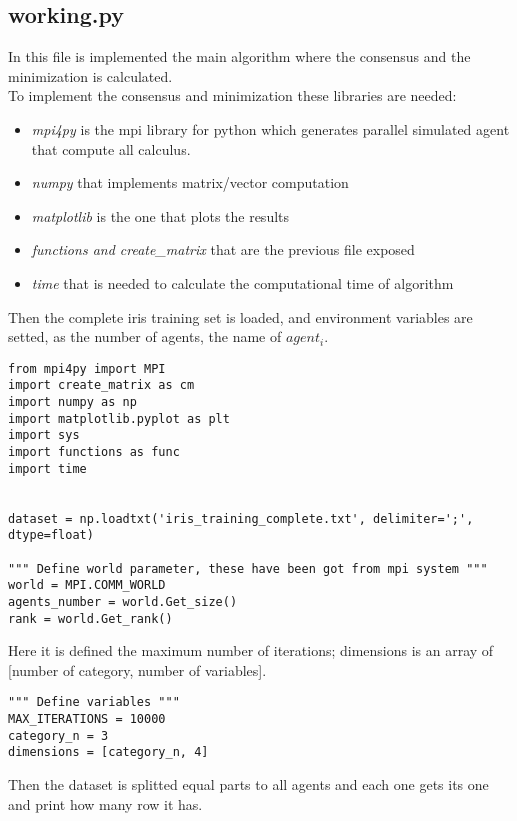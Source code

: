 \documentclass[a4paper,11pt,oneside]{book}
\begin{document}
\subsection {working.py}

In this file is implemented the main algorithm where the consensus and the minimization is calculated.\\

To implement the consensus and minimization these libraries are needed:
\begin{itemize}
    \item \textit{mpi4py} is the mpi library for python which generates parallel simulated agent that compute all calculus.
    \item \textit{numpy} that implements matrix/vector computation
    \item \textit{matplotlib} is the one that plots the results
    \item \textit{functions and create\_matrix} that are the previous file exposed
    \item \textit{time} that is needed to calculate the computational time of algorithm 
\end{itemize} 

Then the complete iris training set is loaded, and environment variables are setted, as the number of agents, the name of $agent_{i}$.

\begin{lstlisting}
from mpi4py import MPI
import create_matrix as cm
import numpy as np
import matplotlib.pyplot as plt
import sys
import functions as func
import time


dataset = np.loadtxt('iris_training_complete.txt', delimiter=';', dtype=float)

""" Define world parameter, these have been got from mpi system """
world = MPI.COMM_WORLD
agents_number = world.Get_size()
rank = world.Get_rank()
\end{lstlisting}

Here it is defined the maximum number of iterations; dimensions is an array of [number of category, number of variables].

\begin{lstlisting}
""" Define variables """
MAX_ITERATIONS = 10000
category_n = 3
dimensions = [category_n, 4]
\end{lstlisting}

Then the dataset is splitted equal parts to all agents and each one gets its one and print how many row it has.
\end{document}
